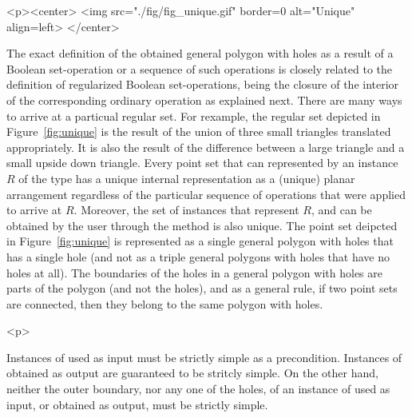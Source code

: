 \lcHtml{\label{fig:unique}}
\begin{ccHtmlOnly}
  <p><center>
    <img src="./fig/fig_unique.gif" border=0 alt="Unique" align=left>
  </center>
\end{ccHtmlOnly}
The exact definition of the obtained general polygon with holes as a
result of a Boolean set-operation or a sequence of such operations is
closely related to the definition of regularized Boolean 
set-operations, being the closure of the interior of the corresponding
ordinary operation as explained next.
There are many ways to arrive at a particual regular set. For
rexample, the regular set depicted in Figure~\ref{fig:unique} is the
result of the union of three small triangles translated
appropriately. It is also the result of the difference between a large
triangle and a small upside down triangle. Every point set that can
represented by an instance $R$ of the  type
has a unique internal representation as a (unique) planar arrangement
regardless of the particular sequence of operations that were applied
to arrive at $R$. Moreover, the set of
 instances that represent $R$, and
can be obtained by the user through the
 method is also unique. The point
set deipcted in Figure~\ref{fig:unique} is represented as a single
general polygon with holes that has a single hole (and not as a triple
general polygons with holes that have no holes at all). The boundaries
of the holes in a general polygon with holes are parts of the polygon
(and not the holes), and as a general rule, if two point sets are
connected, then they belong to the same polygon with holes.
 
\begin{ccHtmlOnly}<p>\end{ccHtmlOnly}
Instances of  used as input must be strictly simple
as a precondition. Instances of  obtained as output
are guaranteed to be stritcly simple. On the other hand, neither the outer
boundary, nor any one of the holes, of an instance of
 used as input, or obtained as output,
must be strictly simple.

